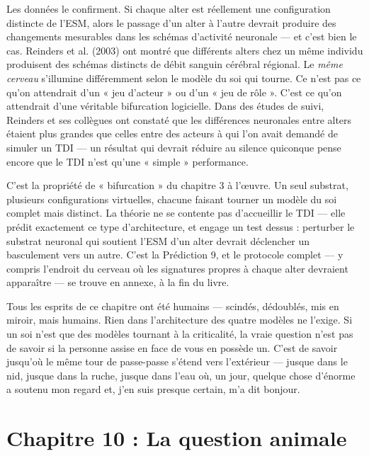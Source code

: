 \documentclass[11pt, twoside, openright]{book}
\begin{document}
Les données le confirment. Si chaque alter est réellement une configuration distincte de l'ESM, alors le passage d'un alter à l'autre devrait produire des changements mesurables dans les schémas d'activité neuronale --- et c'est bien le cas. Reinders et al. (2003) ont montré que différents alters chez un même individu produisent des schémas distincts de débit sanguin cérébral régional. Le \textit{même cerveau} s'illumine différemment selon le modèle du soi qui tourne. Ce n'est pas ce qu'on attendrait d'un « jeu d'acteur » ou d'un « jeu de rôle ». C'est ce qu'on attendrait d'une véritable bifurcation logicielle. Dans des études de suivi, Reinders et ses collègues ont constaté que les différences neuronales entre alters étaient plus grandes que celles entre des acteurs à qui l'on avait demandé de simuler un TDI --- un résultat qui devrait réduire au silence quiconque pense encore que le TDI n'est qu'une « simple » performance.

C'est la propriété de « bifurcation » du chapitre 3 à l'œuvre. Un seul substrat, plusieurs configurations virtuelles, chacune faisant tourner un modèle du soi complet mais distinct. La théorie ne se contente pas d'accueillir le TDI --- elle prédit exactement ce type d'architecture, et engage un test dessus : perturber le substrat neuronal qui soutient l'ESM d'un alter devrait déclencher un basculement vers un autre. C'est la Prédiction 9, et le protocole complet --- y compris l'endroit du cerveau où les signatures propres à chaque alter devraient apparaître --- se trouve en annexe, à la fin du livre.

Tous les esprits de ce chapitre ont été humains --- scindés, dédoublés, mis en miroir, mais humains. Rien dans l'architecture des quatre modèles ne l'exige. Si un soi n'est que des modèles tournant à la criticalité, la vraie question n'est pas de savoir si la personne assise en face de vous en possède un. C'est de savoir jusqu'où le même tour de passe-passe s'étend vers l'extérieur --- jusque dans le nid, jusque dans la ruche, jusque dans l'eau où, un jour, quelque chose d'énorme a soutenu mon regard et, j'en suis presque certain, m'a dit bonjour.


\chapter*{Chapitre 10 : La question animale}
\end{document}
